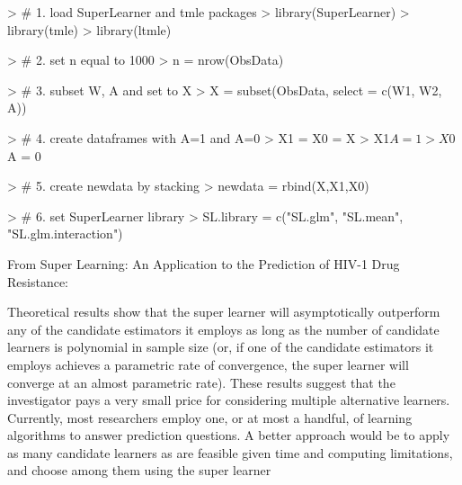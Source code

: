 \documentclass[answers]{exam}
\begin{document}
\begin{solution}

\begin{Schunk}
\begin{Sinput}
> # 1. load SuperLearner and tmle packages
> library(SuperLearner)
> library(tmle)
> library(ltmle)
\end{Sinput}
\end{Schunk}
\begin{Schunk}
\begin{Sinput}
> # 2. set n equal to 1000
> n = nrow(ObsData)
\end{Sinput}
\end{Schunk}
\begin{Schunk}
\begin{Sinput}
> # 3. subset W, A and set to X
> X = subset(ObsData, select = c(W1, W2, A))
\end{Sinput}
\end{Schunk}
\begin{Schunk}
\begin{Sinput}
> # 4. create dataframes with A=1 and A=0
> X1 = X0 = X
> X1$A = 1
> X0$A = 0
\end{Sinput}
\end{Schunk}
\begin{Schunk}
\begin{Sinput}
> # 5. create newdata by stacking
> newdata = rbind(X,X1,X0)
\end{Sinput}
\end{Schunk}
\begin{Schunk}
\begin{Sinput}
> # 6. set SuperLearner library
> SL.library = c("SL.glm", "SL.mean", "SL.glm.interaction")
\end{Sinput}
\end{Schunk}
From Super Learning: An Application to the Prediction of HIV-1 Drug Resistance: 

Theoretical results show that the super learner will asymptotically outperform any of the candidate estimators it employs as long as the number of candidate learners is polynomial in sample size (or, if one of the candidate estimators it employs achieves a parametric rate of convergence, the super learner will converge at an almost parametric rate). These results suggest that the investigator pays a very small price for considering multiple alternative learners. Currently, most researchers employ one, or at most a handful, of learning algorithms to answer prediction questions. A better approach would be to apply as many candidate learners as are feasible given time and computing limitations, and choose among them using the super learner


\end{solution}
\end{document}
